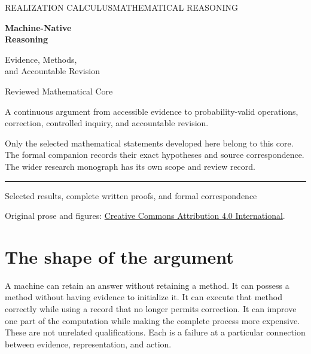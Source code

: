 \documentclass[11pt,oneside,openany]{book}
\theoremstyle{definition}\newtheorem{definition}[theorem]{Definition}
\begin{document}
\frontmatter
\hypersetup{pageanchor=false}
\begin{titlepage}
\thispagestyle{empty}
{\small\scshape REALIZATION CALCULUS\hfill MATHEMATICAL REASONING}\par
\vspace*{1.05in}
{\color{Ink}\fontsize{36}{41}\selectfont\bfseries Machine-Native\\[3mm]Reasoning\par}
\vspace{0.32in}
{\fontsize{20}{27}\selectfont Evidence, Methods,\\and Accountable Revision\par}
\vspace{0.38in}{\color{Accent}\rule{1.9in}{2pt}}\par
\vspace{0.38in}{\Large Komorebi P.\par}
\vfill
{\Large Reviewed Mathematical Core\par}
\vspace{0.25in}
{\large A continuous argument from accessible evidence to probability-valid operations, correction, controlled inquiry, and accountable revision.\par}
\vspace{0.32in}
Only the selected mathematical statements developed here belong to this core. The formal companion records their exact hypotheses and source correspondence. The wider research monograph has its own scope and review record.\par
\vspace{0.5in}
{\color{Ink}\rule{\linewidth}{0.7pt}}\par
{\small Selected results, complete written proofs, and formal correspondence\par}
{\small Original prose and figures: \href{https://creativecommons.org/licenses/by/4.0/}{Creative Commons Attribution 4.0 International}.\par}
\end{titlepage}
\hypersetup{pageanchor=true}
\chapter*{The shape of the argument}
A machine can retain an answer without retaining a method. It can possess a method without having evidence to initialize it. It can execute that method correctly while using a record that no longer permits correction. It can improve one part of the computation while making the complete process more expensive. These are not unrelated qualifications. Each is a failure at a particular connection between evidence, representation, and action.
\end{document}
